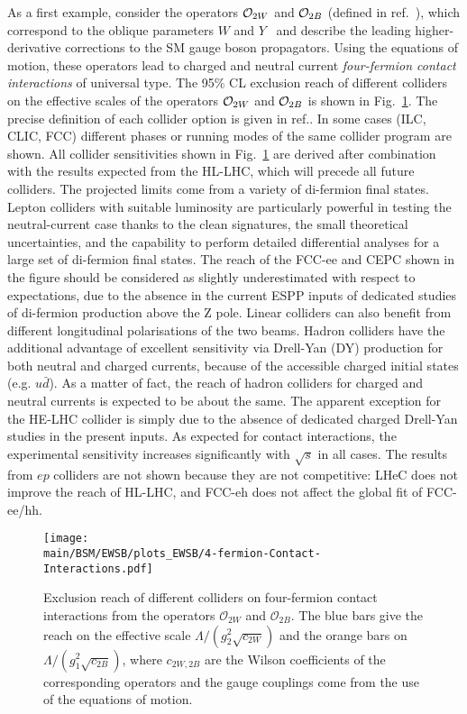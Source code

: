 \documentclass[../report.tex]{subfiles}
\providecommand{\main}{..}
\begin{document}
As a first example, consider the operators ${\cal O}_{2W}$ and ${\cal O}_{2B}$ (defined in ref.~\cite{Giudice:2007fh}), which correspond to the oblique parameters $W$ and $Y$~\cite{Barbieri:2004qk} and describe the leading higher-derivative corrections to the SM gauge boson propagators. Using the equations of motion, these operators lead to charged and neutral current {\it four-fermion contact interactions} of universal type.
The 95\% CL exclusion reach of different colliders on the effective scales of the operators ${\cal O}_{2W}$ and ${\cal O}_{2B}$ is shown in Fig.~\ref{fig:4f}. The precise definition of each collider option is given in ref.\cite{deBlas:2019rxi}. In some cases (ILC, CLIC, FCC) different phases or running modes of the same collider program are shown. All collider sensitivities shown in Fig.~\ref{fig:4f} are derived after combination with the results expected from the HL-LHC, which will precede all future colliders. 
The projected limits come from a variety of di-fermion final states. 
Lepton colliders with suitable luminosity are particularly powerful in testing the neutral-current case thanks to the clean signatures, the small theoretical uncertainties, and the capability to perform detailed differential analyses for a large set of di-fermion final states. The reach of the FCC-ee and CEPC shown in the figure should be considered as slightly underestimated with respect to expectations, due to the absence in the current ESPP inputs of dedicated studies of di-fermion production above the Z pole. Linear colliders can also benefit from different longitudinal polarisations of the two beams.
Hadron colliders have the additional advantage of excellent sensitivity via Drell-Yan (DY) production for both neutral and charged currents, because of the accessible charged initial states (e.g.  $u\bar{d}$). As a matter of fact, the reach of hadron colliders for charged and neutral currents is expected to be about the same. The apparent exception for the HE-LHC collider is simply due to the absence of dedicated charged Drell-Yan studies in the present inputs. As expected for contact interactions, the experimental sensitivity increases significantly with $\sqrt{s}$ in all cases. The results from $ep$ colliders are not shown because they are not competitive: LHeC does not improve the reach of HL-LHC, and FCC-eh does not affect the global fit of FCC-ee/hh.

\begin{figure}[htb]
    \centering
    \texttt{[image: \\main/BSM/EWSB/plots\_EWSB/4-fermion-Contact-Interactions.pdf]}
    \caption{Exclusion reach of different colliders on four-fermion contact interactions from the operators $\mathcal{O}_{2W}$ and $\mathcal{O}_{2B}$. The blue bars give the reach on the effective scale $\Lambda /(g_2^2 \sqrt{c_{2W}})$ and the orange bars on $\Lambda /(g_1^2 \sqrt{c_{2B}})$, where $c_{2W,2B}$ are the Wilson coefficients of the corresponding operators and the gauge couplings come from the use of the equations of motion.}
    \label{fig:4f}
\end{figure}
\end{document}

